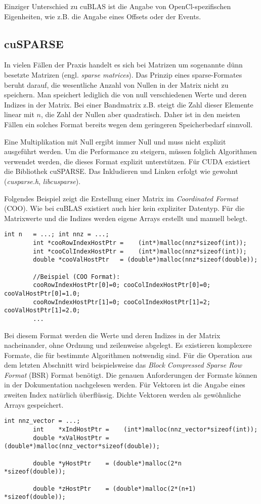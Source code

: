 		Einziger Unterschied zu cuBLAS ist die Angabe von OpenCl-spezifischen Eigenheiten, wie z.B. die Angabe eines Offsets oder	
der Events.
		
		\subsection{cuSPARSE}
		In vielen Fällen der Praxis handelt es sich bei Matrizen um sogenannte dünn besetzte Matrizen (engl. \textit{sparse matrices}). Das Prinzip eines sparse-Formates beruht darauf, die wesentliche Anzahl von Nullen in der Matrix nicht zu speichern. Man speichert lediglich die von null verschiedenen Werte und deren Indizes in der Matrix. Bei einer Bandmatrix z.B. steigt die Zahl dieser Elemente linear mit $n$, die Zahl der Nullen aber quadratisch. Daher ist in den meisten Fällen ein solches Format bereits wegen dem geringeren Speicherbedarf sinnvoll. 
		
		Eine Multiplikation mit Null ergibt immer Null und muss nicht explizit ausgeführt werden. Um die Performance zu steigern, müssen folglich Algorithmen verwendet werden, die dieses Format explizit unterstützen. Für CUDA existiert die Bibliothek cuSPARSE. Das Inkludieren und Linken erfolgt wie gewohnt (\textit{cusparse.h}, \textit{libcusparse}).
		
		Folgendes Beispiel zeigt die Erstellung einer Matrix im \textit{Coordinated Format} (COO). Wie bei cuBLAS existiert auch hier kein expliziter Datentyp. Für die Matrixwerte und die Indizes werden eigene Arrays erstellt und manuell belegt.	
		\begin{lstlisting}[caption=cuSPARSE: Matrix erstellen]
		int n   = ...; int nnz = ...;
		int *cooRowIndexHostPtr =    (int*)malloc(nnz*sizeof(int));
		int *cooColIndexHostPtr =    (int*)malloc(nnz*sizeof(int));
		double *cooValHostPtr   = (double*)malloc(nnz*sizeof(double));

		//Beispiel (COO Format): 
		cooRowIndexHostPtr[0]=0; cooColIndexHostPtr[0]=0; cooValHostPtr[0]=1.0;
		cooRowIndexHostPtr[1]=0; cooColIndexHostPtr[1]=2; cooValHostPtr[1]=2.0;
		...		
		\end{lstlisting}

		Bei diesem Format werden die Werte und deren Indizes in der Matrix nacheinander, ohne Ordnung und zeilenweise abgelegt. Es existieren komplexere Formate, die für bestimmte Algorithmen notwendig sind. Für die Operation aus dem letzten Abschnitt wird beispielsweise das \textit{Block Compressed Sparse Row Format} (BSR) Format benötigt. Die genauen Anforderungen der Formate können in der Dokumentation nachgelesen werden. \cite{cusparseDoc}
		Für Vektoren ist die Angabe eines zweiten Index natürlich überflüssig. Dichte Vektoren werden als gewöhnliche Arrays gespeichert.
		\begin{lstlisting}[caption=cuSPARSE: Vektor erstellen]
		int nnz_vector = ...;
		int    *xIndHostPtr =    (int*)malloc(nnz_vector*sizeof(int));
		double *xValHostPtr = (double*)malloc(nnz_vector*sizeof(double));
    
		double *yHostPtr    = (double*)malloc(2*n       *sizeof(double));
    
		double *zHostPtr    = (double*)malloc(2*(n+1)   *sizeof(double));
		\end{lstlisting}


